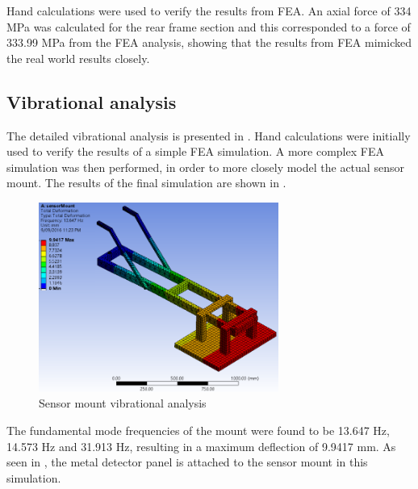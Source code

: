 \documentclass[main.tex]{subfiles}
\begin{document}
Hand calculations were used to verify the results from FEA. An axial force of 334 MPa was calculated for the rear frame section and this corresponded to a force of 333.99 MPa from the FEA analysis, showing that the results from FEA mimicked the real world results closely. 

\subsection{Vibrational analysis}
The detailed vibrational analysis is presented in . Hand calculations were initially used to verify the results of a simple FEA simulation. A more complex FEA simulation was then performed, in order to more closely model the actual sensor mount. The results of the final simulation are shown in . 

\begin{figure}[ht]
\includegraphics[width=0.7\textwidth]{4-DetailedDesign/vibrations.PNG}
\centering
\caption{Sensor mount vibrational analysis} 
\end{figure} 

The fundamental mode frequencies of the mount were found to be 13.647 Hz, 14.573 Hz and 31.913 Hz, resulting in a maximum deflection of 9.9417 mm. As seen in , the metal detector panel is attached to the sensor mount in this simulation. 
\end{document}
